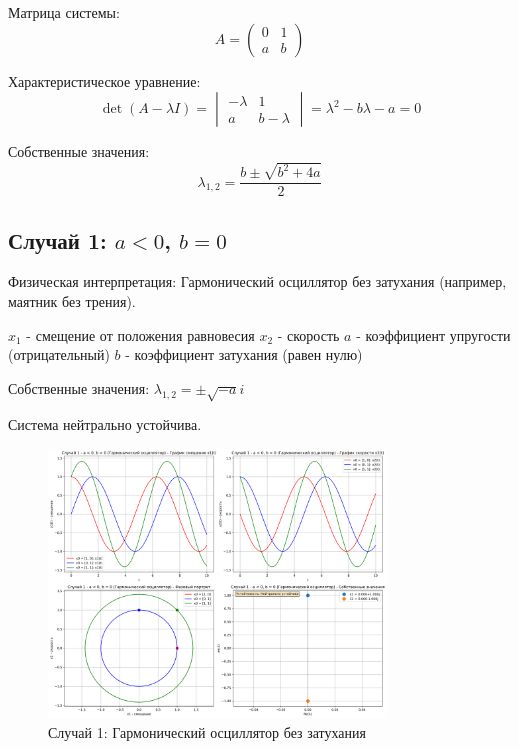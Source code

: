 Матрица системы:
\begin{equation}
A = \begin{pmatrix} 0 & 1 \\ a & b \end{pmatrix}
\end{equation}

Характеристическое уравнение:
\begin{equation}
\det(A - \lambda I) = \begin{vmatrix} -\lambda & 1 \\ a & b-\lambda \end{vmatrix} = \lambda^2 - b\lambda - a = 0
\end{equation}

Собственные значения:
\begin{equation}
\lambda_{1,2} = \frac{b \pm \sqrt{b^2 + 4a}}{2}
\end{equation}

\subsection{Случай 1: $a < 0$, $b = 0$}

Физическая интерпретация: Гармонический осциллятор без затухания (например, маятник без трения).

$x_1$ - смещение от положения равновесия
$x_2$ - скорость
$a$ - коэффициент упругости (отрицательный)
$b$ - коэффициент затухания (равен нулю)

Собственные значения: $\lambda_{1,2} = \pm \sqrt{-a}i$

Система нейтрально устойчива.

\begin{figure}[h!]
\centering
\includegraphics[width=0.8\textwidth]{images/task3/случай_1_-_a_<_0_b_=_0_гармонический_осциллятор.png}
\caption{Случай 1: Гармонический осциллятор без затухания}
\label{fig:oscillator1}
\end{figure}

